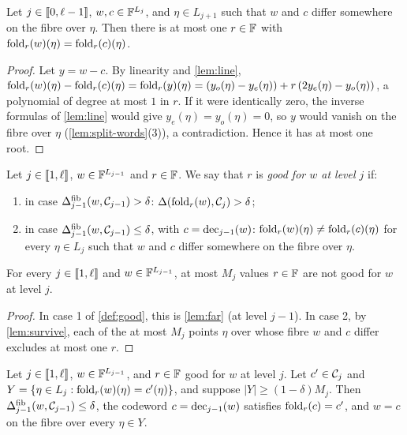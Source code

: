 \begin{lemma}\label{lem:survive}
Let $j \in \llbracket 0, \ell-1 \rrbracket$, $w, c \in \mathbb{F}^{L_j}$, and $\eta \in L_{j+1}$ such that $w$ and $c$ differ somewhere on the fibre over $\eta$. Then there is at most one $r \in \mathbb{F}$ with $\mathrm{fold}_r(w)(\eta) = \mathrm{fold}_r(c)(\eta)$.
\end{lemma}

\begin{proof}
Let $y = w - c$. By linearity and \cref{lem:line}, $\mathrm{fold}_r(w)(\eta) - \mathrm{fold}_r(c)(\eta) = \mathrm{fold}_r(y)(\eta) = (y_o(\eta) - y_e(\eta)) + r\,(2y_e(\eta) - y_o(\eta))$, a polynomial of degree at most $1$ in $r$.
If it were identically zero, the inverse formulas of \cref{lem:line} would give $y_e(\eta) = y_o(\eta) = 0$, so $y$ would vanish on the fibre over $\eta$ (\cref{lem:split-words}(3)), a contradiction. Hence it has at most one root.
\end{proof}

\begin{definition}\label{def:good}
Let $j \in \llbracket 1, \ell \rrbracket$, $w \in \mathbb{F}^{L_{j-1}}$ and $r \in \mathbb{F}$. We say that $r$ is \emph{good for $w$ at level $j$} if:
\begin{enumerate}
  \item in case $\Delta^{\mathrm{fib}}_{j-1}(w, \mathcal{C}_{j-1}) > \delta$: $\Delta(\mathrm{fold}_r(w), \mathcal{C}_{j}) > \delta$;
  \item in case $\Delta^{\mathrm{fib}}_{j-1}(w, \mathcal{C}_{j-1}) \le \delta$, with $c = \mathrm{dec}_{j-1}(w)$: $\mathrm{fold}_r(w)(\eta) \ne \mathrm{fold}_r(c)(\eta)$ for every $\eta \in L_j$ such that $w$ and $c$ differ somewhere on the fibre over $\eta$.
\end{enumerate}
\end{definition}

\begin{lemma}\label{lem:good}
For every $j \in \llbracket 1, \ell \rrbracket$ and $w \in \mathbb{F}^{L_{j-1}}$, at most $M_j$ values $r \in \mathbb{F}$ are not good for $w$ at level $j$.
\end{lemma}

\begin{proof}
In case 1 of \cref{def:good}, this is \cref{lem:far} (at level $j-1$). In case 2, by \cref{lem:survive}, each of the at most $M_j$ points $\eta$ over whose fibre $w$ and $c$ differ excludes at most one $r$.
\end{proof}

\begin{lemma}\label{lem:step}
Let $j \in \llbracket 1, \ell \rrbracket$, $w \in \mathbb{F}^{L_{j-1}}$, and $r \in \mathbb{F}$ good for $w$ at level $j$.
Let $c' \in \mathcal{C}_j$ and $Y = \{\eta \in L_j : \mathrm{fold}_r(w)(\eta) = c'(\eta)\}$, and suppose $|Y| \ge (1-\delta) M_j$.
Then $\Delta^{\mathrm{fib}}_{j-1}(w, \mathcal{C}_{j-1}) \le \delta$, the codeword $c = \mathrm{dec}_{j-1}(w)$ satisfies $\mathrm{fold}_r(c) = c'$, and $w = c$ on the fibre over every $\eta \in Y$.
\end{lemma}


